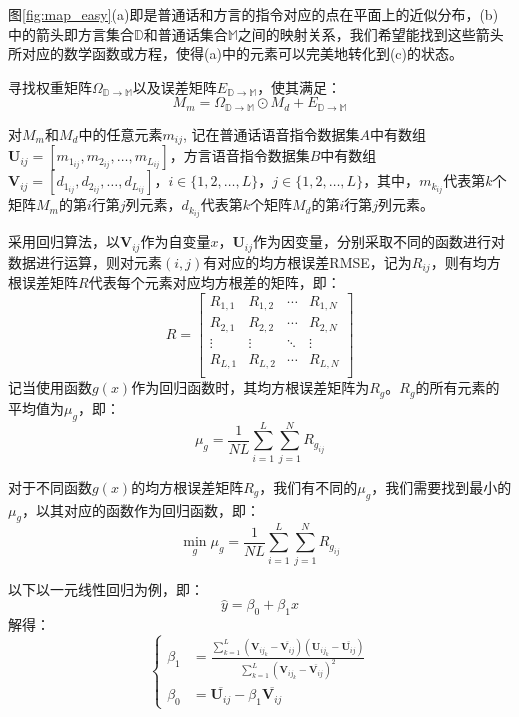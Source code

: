 \documentclass[lang=cn,cite=super]{elegantpaper}
\begin{document}
图\ref{fig:map_easy}(a)即是普通话和方言的指令对应的点在平面上的近似分布，(b)中的箭头即方言集合$\mathbb{D}$和普通话集合$\mathbb{M}$之间的映射关系，我们希望能找到这些箭头所对应的数学函数或方程，使得(a)中的元素可以完美地转化到(c)的状态。

寻找权重矩阵$\Omega_{\mathbb{D}\rightarrow \mathbb{M}}$以及误差矩阵$E_{\mathbb{D}\rightarrow \mathbb{M}}$，使其满足：
\begin{equation}
    M_m = \Omega_{\mathbb{D}\rightarrow  \mathbb{M}} \odot M_d + E_{\mathbb{D}\rightarrow \mathbb {M}}
\end{equation}

对$M_m$和$M_d$中的任意元素$m_{ij}$, 记在普通话语音指令数据集$A$中有数组$\mathbf{U}_{ij} = [m_{1_{ij}}, m_{2_{ij}}, \ldots, m_{L_{ij}}]$，方言语音指令数据集$B$中有数组$\mathbf{V}_{ij} = [d_{1_{ij}}, d_{2_{ij}}, \ldots, d_{L_{ij}}]$，$i \in \{ 1, 2, \ldots, L\}$，$j \in \{ 1, 2, \ldots, L\}$，其中，$m_{k_{ij}}$代表第$k$个矩阵$M_m$的第$i$行第$j$列元素，$d_{k_{ij}}$代表第$k$个矩阵$M_d$的第$i$行第$j$列元素。

采用回归算法，以$\mathbf{V}_{ij}$作为自变量$x$，$\mathbf{U}_{ij}$作为因变量，分别采取不同的函数进行对数据进行运算，则对元素$(i,j)$有对应的均方根误差RMSE，记为$R_{ij}$，则有均方根误差矩阵$R$代表每个元素对应均方根差的矩阵，即：
\begin{equation}
    R = \begin{bmatrix}
        R_{1,1} & R_{1,2} & \cdots & R_{1,N}\\
        R_{2,1} & R_{2,2} & \cdots & R_{2,N}\\
        \vdots & \vdots & \ddots & \vdots\\
        R_{L,1} & R_{L,2} & \cdots & R_{L,N}\\
    \end{bmatrix}
\end{equation}
记当使用函数$g(x)$作为回归函数时，其均方根误差矩阵为$R_g$。$R_g$的所有元素的平均值为$\mu_g$，即：
\begin{equation}
    \mu_g = \frac{1}{NL}\sum_{i=1}^{L} \sum_{j=1}^{N} R_{g_{ij}}
\end{equation}

对于不同函数$g(x)$的均方根误差矩阵$R_g$，我们有不同的$\mu_g$，我们需要找到最小的$\mu_g$，以其对应的函数作为回归函数，即：
\begin{equation}
    \mathop{\min}_{g} \mu_g = \frac{1}{NL}\sum_{i=1}^{L} \sum_{j=1}^{N} R_{g_{ij}}
\end{equation}

以下以一元线性回归为例，即：
\begin{equation}
    \hat{y} = \beta_0 + \beta_1 x
\end{equation}
解得：
\begin{equation}
    \left\{ 
    \begin{aligned}
           \beta_1 &= \frac{\sum_{k=1}^{L} (\mathbf{V}_{{ij}_k}-\overline{\mathbf{V}_{ij}}) (\mathbf{U}_{{ij}_k}-\overline{\mathbf{U}_{ij}})}{\sum_{k=1}^{L} (\mathbf{V}_{{ij}_k}-\overline{\mathbf{V}_{ij}})^2}\\
        \beta_0 &= \overline{\mathbf{U}_{ij}}-\beta_1 \overline{\mathbf{V}_{ij}}
    \end{aligned}
    \right.
\end{equation}
\end{document}
